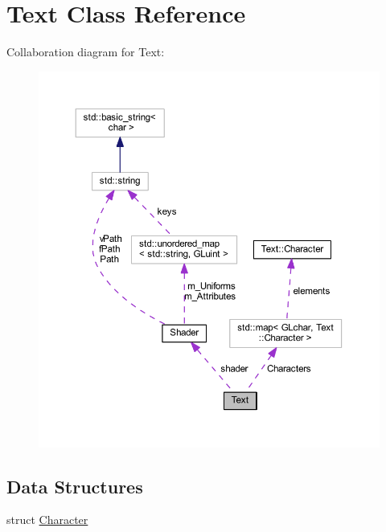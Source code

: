 \hypertarget{class_text}{}\section{Text Class Reference}
\label{class_text}


Collaboration diagram for Text\+:
\nopagebreak
\begin{figure}[H]
\begin{center}
\leavevmode
\includegraphics[width=350pt]{class_text__coll__graph}
\end{center}
\end{figure}
\subsection*{Data Structures}
\begin{DoxyCompactItemize}
\item 
struct \hyperlink{struct_text_1_1_character}{Character}
\end{DoxyCompactItemize}
